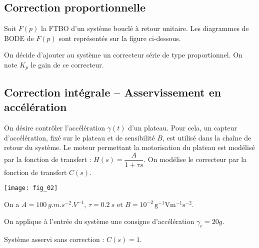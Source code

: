 \setcounter{exo}{0}
\begin{multicols}{2}

\subsection*{Correction proportionnelle}
Soit $F(p)$ la FTBO d'un système bouclé à retour unitaire. Les diagrammes de BODE de $F(p)$ sont représentés
sur la figure ci-dessous.



On décide d’ajouter au système un correcteur série de type proportionnel. On note $K_p$ le gain de ce
correcteur.





\subsection*{Correction intégrale -- Asservissement en accélération}
\setcounter{exo}{0}
On désire contrôler l'accélération $\gamma(t)$ d'un plateau. Pour cela, un capteur d'accélération, fixé sur le plateau
et de sensibilité $B$, est utilisé dans la chaîne de retour du système. Le moteur permettant la motorisation du
plateau est modélisé par la fonction de transfert : $H(s)=\dfrac{A}{1+\tau s}$. 
On modélise le correcteur par la fonction de transfert $C(s)$.
\begin{center}
\texttt{[image: fig\_02]}
\end{center}

On a $A=\SI{100}{g.m.s^{-2}.V^{-1}}$, $\tau=\SI{0,2}{s}$ et $B=10^{-2}\,\text{g}^{-1}\text{V}\text{m}^{-1}\text{s}^{-2}$.


On applique à l’entrée du système une consigne d’accélération $\gamma_c=20 g$.

Système asservi sans correction : $C(s)=1$.


\end{multicols}
